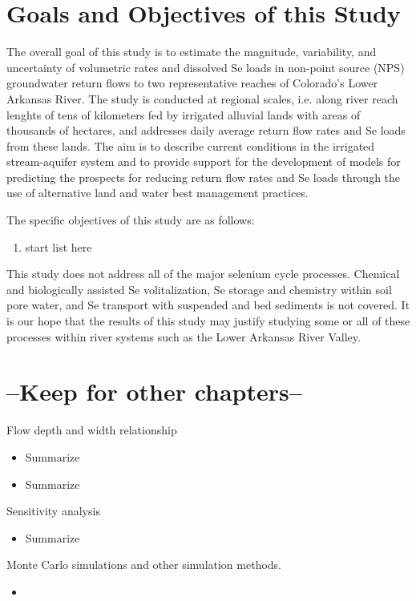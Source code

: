 \begin{linenumbers}[1]
\section{Goals and Objectives of this Study}
The overall goal of this study is to estimate the magnitude, variability, and uncertainty of volumetric rates and dissolved Se loads in non-point source (NPS) groundwater return flows to two representative reaches of Colorado's Lower Arkansas River.  The study is conducted at regional scales, i.e. along river reach lenghts of tens of kilometers fed by irrigated alluvial lands with areas of thousands of hectares, and addresses daily average return flow rates and Se loads from these lands.  The aim is to describe current conditions in the irrigated stream-aquifer system and to provide support for the development of models for predicting the prospects for reducing return flow rates and Se loads through the use of alternative land and water best management practices.

The specific objectives of this study are as follows:
\begin{enumerate}
	\item start list here
\end{enumerate}

This study does not address all of the major selenium cycle processes.  Chemical and biologically assisted Se volitalization, Se storage and chemistry within soil pore water, and Se transport with suspended and bed sediments is not covered.  It is our hope that the results of this study may justify studying some or all of these processes within river systems such as the Lower Arkansas River Valley.

\section{--Keep for other chapters--}
Flow depth and width relationship
\begin{itemize}
	\item Summarize \citep{Gates1996}
	\item Summarize \citep{Buhman2002}
\end{itemize}

Sensitivity analysis
\begin{itemize}
	\item Summarize \citep{Saltelli2004}
\end{itemize} 

Monte Carlo simulations and other simulation methods.
\begin{itemize}
	\item \citet{Spanou2001}
\end{itemize}

\end{linenumbers}
\clearpage{}